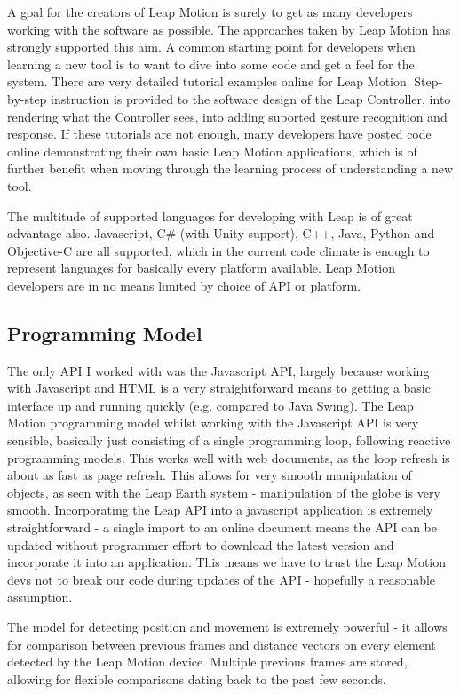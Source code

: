 \documentclass{sigplanconf}
\begin{document}
A goal for the creators of Leap Motion is surely to get as many developers working with the software as possible. The approaches taken by Leap Motion has strongly supported this aim. A common starting point for developers when learning a new tool is to want to dive into some code and get a feel for the system. There are very detailed tutorial examples online for Leap Motion. Step-by-step instruction is provided to the software design of the Leap Controller, into rendering what the Controller sees, into adding suported gesture recognition and response. If these tutorials are not enough, many developers have posted code online demonstrating their own basic Leap Motion applications, which is of further benefit when moving through the learning process of understanding a new tool. 

The multitude of supported languages for developing with Leap is of great advantage also. Javascript, C\# (with Unity support), C++, Java, Python and Objective-C are all supported, which in the current code climate is enough to represent languages for basically every platform available. Leap Motion developers are in no means limited by choice of API or platform.

\subsection{Programming Model}

The only API I worked with was the Javascript API, largely because working with Javascript and HTML is a very straightforward means to getting a basic interface up and running quickly (e.g. compared to Java Swing). The Leap Motion programming model whilst working with the Javascript API is very sensible, basically just consisting of a single programming loop, following reactive programming models. This works well with web documents, as the loop refresh is about as fast as page refresh. This allows for very smooth manipulation of objects, as seen with the Leap Earth system - manipulation of the globe is very smooth. Incorporating the Leap API into a javascript application is extremely straightforward - a single import to an online document means the API can be updated without programmer effort to download the latest version and incorporate it into an application. This means we have to trust the Leap Motion devs not to break our code during updates of the API - hopefully a reasonable assumption. 

The model for detecting position and movement is extremely powerful - it allows for comparison between previous frames and distance vectors on every element detected by the Leap Motion device. Multiple previous frames are stored, allowing for flexible comparisons dating back to the past few seconds. 
\end{document}
